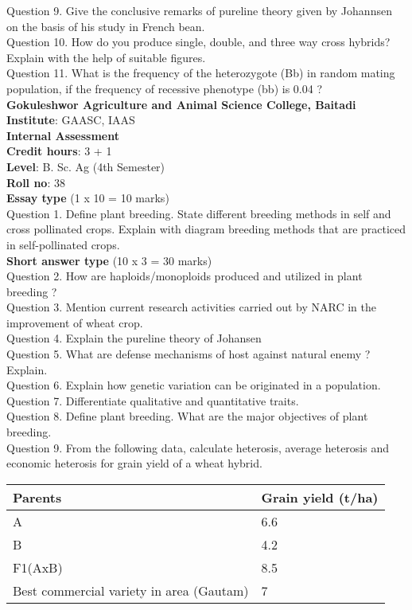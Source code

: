 \documentclass[12pt]{article}\usepackage[]{graphicx}\usepackage[]{color}
\begin{document}
Question 9. Give the conclusive remarks of pureline theory given by Johannsen on the basis of his study in French bean.\\
Question 10. How do you produce single, double, and three way cross hybrids? Explain with the help of suitable figures.\\
Question 11. What is the frequency of the heterozygote (Bb) in random mating population, if the frequency of recessive phenotype (bb) is 0.04 ?\\
\clearpage 
{\centering \Large{\textbf{Gokuleshwor Agriculture and Animal Science College, Baitadi}} \\[0.25cm]
            \textbf{Institute}: GAASC, IAAS \\[0.2cm]
            \textbf{Internal Assessment} \\[0.2cm]} 
\textbf{Credit hours}: 3 + 1 \\ 
\textbf{Level}: B. Sc. Ag (4th Semester) \\
\textbf{Roll no}: 38 \\[0.5cm] 
\textbf{Essay type} (1 x 10 = 10 marks) \\
Question 1. Define plant breeding. State different breeding methods in self and cross pollinated crops. Explain with diagram breeding methods that are practiced in self-pollinated crops.\\
\textbf{Short answer type} (10 x 3 = 30 marks) \\
Question 2. How are haploids/monoploids produced and utilized in plant breeding ?\\
Question 3. Mention current research activities carried out by NARC in the improvement of wheat crop.\\
Question 4. Explain the pureline theory of Johansen\\
Question 5. What are defense mechanisms of host against natural enemy ? Explain.\\
Question 6. Explain how genetic variation can be originated in a population.\\
Question 7. Differentiate qualitative and quantitative traits.\\
Question 8. Define plant breeding. What are the major objectives of plant breeding.\\
Question 9. From the following data, calculate heterosis, average heterosis and economic heterosis for grain yield of a wheat hybrid.\\ 
\begin{table}[H]
\centering\begingroup\fontsize{8}{10}\selectfont

\begin{tabular}[t]{ll}
\toprule
Parents & Grain yield (t/ha)\\
\midrule
A & 6.6\\
B & 4.2\\
F1(AxB) & 8.5\\
Best commercial variety in area (Gautam) & 7\\
\bottomrule
\end{tabular}
\endgroup{}
\end{table}
\end{document}
